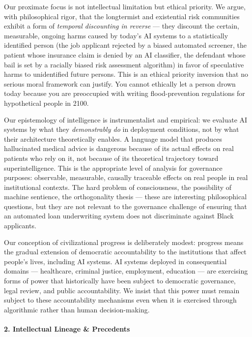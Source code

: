 Our proximate focus is not intellectual limitation but ethical priority.
We argue, with philosophical rigor, that the longtermist and existential
risk communities exhibit a form of \emph{temporal discounting in
reverse} --- they discount the certain, measurable, ongoing harms caused
by today's AI systems to a statistically identified person (the job
applicant rejected by a biased automated screener, the patient whose
insurance claim is denied by an AI classifier, the defendant whose bail
is set by a racially biased risk assessment algorithm) in favor of
speculative harms to unidentified future persons. This is an ethical
priority inversion that no serious moral framework can justify. You
cannot ethically let a person drown today because you are preoccupied
with writing flood-prevention regulations for hypothetical people in
2100.

Our epistemology of intelligence is instrumentalist and empirical: we
evaluate AI systems by what they \emph{demonstrably do} in deployment
conditions, not by what their architecture theoretically enables. A
language model that produces hallucinated medical advice is dangerous
because of its actual effects on real patients who rely on it, not
because of its theoretical trajectory toward superintelligence. This is
the appropriate level of analysis for governance purposes: observable,
measurable, causally traceable effects on real people in real
institutional contexts. The hard problem of consciousness, the
possibility of machine sentience, the orthogonality thesis --- these are
interesting philosophical questions, but they are not relevant to the
governance challenge of ensuring that an automated loan underwriting
system does not discriminate against Black applicants.

Our conception of civilizational progress is deliberately modest:
progress means the gradual extension of democratic accountability to the
institutions that affect people's lives, including AI systems. AI
systems deployed in consequential domains --- healthcare, criminal
justice, employment, education --- are exercising forms of power that
historically have been subject to democratic governance, legal review,
and public accountability. We insist that this power must remain subject
to these accountability mechanisms even when it is exercised through
algorithmic rather than human decision-making.

\paragraph{2. Intellectual Lineage \&
Precedents}\label{intellectual-lineage-precedents-5}

